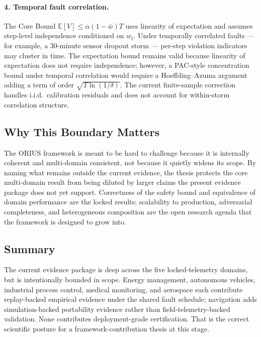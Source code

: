\paragraph{4. Temporal fault correlation.}
The Core Bound $\mathbb{E}[V] \le \alpha(1-\bar{w})T$ uses linearity of
expectation and assumes step-level independence conditioned on $w_t$.
Under temporally correlated faults --- for example, a 30-minute sensor
dropout storm --- per-step violation indicators may cluster in time.  The
expectation bound remains valid because linearity of expectation does not
require independence; however, a PAC-style concentration bound under
temporal correlation would require a Hoeffding--Azuma argument adding a
term of order $\sqrt{T \ln(1/\delta)}$.  The current finite-sample
correction handles i.i.d.\ calibration residuals and does not account
for within-storm correlation structure.

\subsection{Why This Boundary Matters}

The ORIUS framework is meant to be hard to challenge because it is internally
coherent and multi-domain consistent, not because it quietly widens its scope.
By naming what remains outside the current evidence, the thesis protects the
core multi-domain result from being diluted by larger claims the present
evidence package does not yet support.  Correctness of the safety bound and
equivalence of domain performance are the locked results; scalability to
production, adversarial completeness, and heterogeneous composition are the
open research agenda that the framework is designed to grow into.

\subsection{Summary}

The current evidence package is deep across the five locked-telemetry domains,
but is intentionally bounded in scope.  Energy management, autonomous vehicles,
industrial process control, medical monitoring, and aerospace each contribute
replay-backed empirical evidence under the shared fault schedule; navigation
adds simulation-backed portability evidence rather than field-telemetry-backed
validation.  None contributes deployment-grade certification.  That is the
correct scientific posture for a framework-contribution thesis at this stage.
